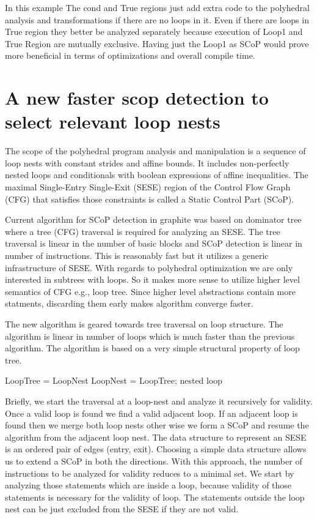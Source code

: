 \documentclass{sigplanconf}
\begin{document}
\begin{comment}
Scop
Cond
|
|--True Region
|
|--False Region
|       | Loop1
|       |
\end{comment}

In this example The cond and True regions just add extra code to the polyhedral analysis and transformations if there
are no loops in it. Even if there are loops in True region they better be analyzed separately because
execution of Loop1 and True Region are mutually exclusive.
Having just the Loop1 as SCoP would prove more beneficial in terms of optimizations and overall compile time.



\section{A new faster scop detection to select relevant loop nests}
The scope of the polyhedral program analysis and manipulation is a sequence of loop
nests with constant strides and affine bounds. It includes non-perfectly nested loops
and conditionals with boolean expressions of affine inequalities.
The maximal Single-Entry Single-Exit (SESE) region of the Control Flow Graph
(CFG) that satisfies those constraints is called a Static Control Part (SCoP). \cite{Girbal, Bondhugula, trifunovic}

Current algorithm for SCoP detection in graphite was based on dominator tree where a tree (CFG) traversal is required
for analyzing an SESE. The tree traversal is linear in the number of basic blocks and SCoP detection is linear in
number of instructions. This is reasonably fast but it utilizes a generic infrastructure of SESE. With regards to
polyhedral optimization we are only interested in subtrees with loops. So it makes more sense to utilize higher level
semantics of CFG e.g., loop tree. Since higher level abstractions contain more statments, discarding them early
makes algorithm converge faster.

The new algorithm is geared towards tree traversal on loop structure. The algorithm is linear in number of loops
which is much faster than the previous algorithm. The algorithm is based on a very simple structural property of loop
tree.

LoopTree = LoopNest
LoopNest = LoopTree; nested loop

Briefly, we start the traversal at a loop-nest and analyze it recursively for validity. Once a valid loop is
found we find a valid adjacent loop. If an adjacent loop is found then we merge both loop nests
other wise we form a SCoP and resume the algorithm from the adjacent loop nest. The data structure to represent an SESE
is an ordered pair of edges (entry, exit). Choosing a simple data structure allows us to extend a SCoP in both the
directions. With this approach, the number of instructions to be analyzed for validity reduces to a minimal set.
We start by analyzing those statements which are inside a loop, because validity of those statements is
necessary for the validity of loop. The statements outside the loop nest can be just excluded from the
SESE if they are not valid.
\end{document}
